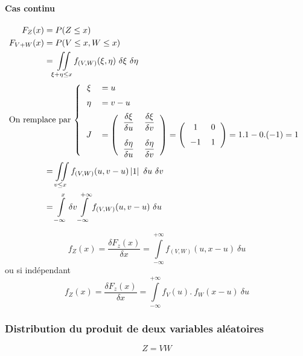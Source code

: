 \paragraph{Cas continu}
\begin{align*}
	F_Z(x)     &= P(Z \leq x)\\
	F_{V+W}(x) &= P(V \leq x, W \leq x) \\
	           &= \iint\limits_{\xi + \eta\leq x} f_{(V,W)}(\xi,\eta)\ \delta\xi\ \delta\eta\\
\intertext{On remplace par $\left\{
\begin{tabular}{cl}
	$\xi$  & $= u$\\[0.2cm]
	$\eta$ & $= v-u$\\[0.2cm]
	$J$    & $= \left(\begin{tabular}{cc}$\dfrac{\delta\xi}{\delta u}$&$\dfrac{\delta \xi}{\delta v}$\\[0.5cm]$\dfrac{\delta\eta}{\delta u}$&$\dfrac{\delta\eta}{\delta v}$\end{tabular}\right) = \left(\begin{tabular}{cc}1&0\\[0.2cm]$-1$&$1$\end{tabular}\right) = 1.1-0.(-1) = 1$
\end{tabular}
\right.$}
	&= \iint\limits_{v\leq x} f_{(V,W)}(u,v-u)\left|1\right|\ \delta u\ \delta v\\
	&= \int\limits_{-\infty}^x\delta v \int\limits_{-\infty}^{+\infty} f_{(V,W)}(u,v-u)\ \delta u
\end{align*}

$$\boxed{f_Z(x) = \frac{\delta F_z(x)}{\delta x} = \int\limits_{-\infty}^{+\infty} f_{(V,W)}(u,x-u)\ \delta u }$$
ou si indépendant
$$\boxed{f_Z(x) = \frac{\delta F_z(x)}{\delta x} = \int\limits_{-\infty}^{+\infty} f_V\left(u\right).\ f_W\left(x-u\right)\ \delta u }$$



\newpage
\subsubsection{Distribution du produit de deux variables aléatoires}
$$\boxed{Z = VW}$$

